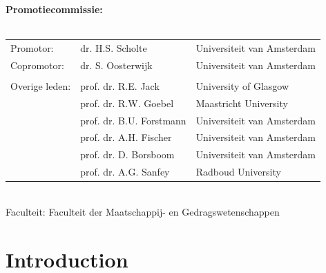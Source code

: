 \documentclass[12pt,american,a4paper,oneside,]{memoir} %
\newcommand{\CoverName}{cover} %
\begin{document}
\clearpage
\thispagestyle{empty}
\noindent\textbf{Promotiecommissie:}\\
\\
\noindent\begin{tabular}{@{}lll}

Promotor:
&  dr. H.S. Scholte & Universiteit van Amsterdam\\

Copromotor:
&  dr. S. Oosterwijk & Universiteit van Amsterdam\\

\\
Overige leden:
&  prof. dr. R.E. Jack & University of Glasgow\\
&  prof. dr. R.W. Goebel & Maastricht University\\
&  prof. dr. B.U. Forstmann & Universiteit van Amsterdam\\
&  prof. dr. A.H. Fischer & Universiteit van Amsterdam\\
&  prof. dr. D. Borsboom & Universiteit van Amsterdam\\
&  prof. dr. A.G. Sanfey & Radboud University\\
\end{tabular}\\

\noindent Faculteit: Faculteit der Maatschappij- en Gedragswetenschappen




\setlength{\abstitleskip}{-\absparindent}

\pagestyle{empty}
\renewcommand{\thepage}{\CoverName} %



{
\setcounter{tocdepth}{1}
\tableofcontents
}
\mainmatter
\hypertarget{introduction}{%
\chapter{Introduction}\label{introduction}}
\end{document}
